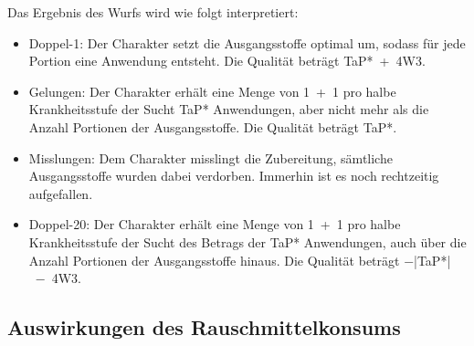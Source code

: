 Das Ergebnis des Wurfs wird wie folgt interpretiert:
\begin{itemize}
	\item Doppel-1: Der Charakter setzt die Ausgangsstoffe optimal um, sodass für jede Portion eine Anwendung entsteht. Die Qualität beträgt TaP*~+~4W3.
	\item Gelungen: Der Charakter erhält eine Menge von 1~+~1 pro halbe Krankheitsstufe der Sucht TaP* Anwendungen, aber nicht mehr als die Anzahl Portionen der Ausgangsstoffe. Die Qualität beträgt TaP*.
	\item Misslungen: Dem Charakter misslingt die Zubereitung, sämtliche Ausgangsstoffe wurden dabei verdorben. Immerhin ist es noch rechtzeitig aufgefallen.
	\item Doppel-20: Der Charakter erhält eine Menge von 1~+~1 pro halbe Krankheitsstufe der Sucht des Betrags der TaP* Anwendungen, auch über die Anzahl Portionen der Ausgangsstoffe hinaus. Die Qualität beträgt −|TaP*|~−~4W3.
\end{itemize}

\subsection{Auswirkungen des Rauschmittelkonsums\label{auswirkungen}}

